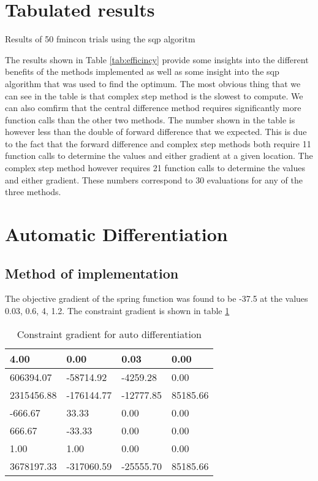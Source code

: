 \documentclass{article}
\begin{document}
\section{Tabulated results}
\begin{table}[H]
	\caption{Results of 50 fmincon trials using the sqp algoritm}
	\label{tab:efficincy}
	\noindent{}
\end{table}

The results shown in Table \ref{tab:efficincy} provide some insights into the
different benefits of the methods implemented as well as some insight into the
sqp algorithm that was used to find the optimum.  The most obvious thing that we
can see in the table is that complex step method is the slowest to compute.  We
can also comfirm that the central difference method requires significantly more
function calls than the other two methods.  The number shown in the table is
however less than the double of forward difference that we expected.  This is
due to the fact that the forward difference and complex step methods both
require 11 function calls to determine the values and either gradient at a given location. The
complex step method however requires 21 function calls to determine the values and either
gradient.  These numbers correspond to 30 evaluations for any of the three
methods.


\section{Automatic Differentiation}
\subsection{Method of implementation}
The objective gradient of the spring function was found to be -37.5 at the values 0.03, 0.6, 4, 1.2.  The constraint gradient is shown in table \ref{tab:ad_grad}

\begin{table}[h]
	\centering
	\caption{Constraint gradient for auto differentiation}
	\label{tab:ad_grad}
	\begin{tabular}{|l|l|l|l|}
		\hline
		4.00       & 0.00       & 0.03      & 0.00     \\\hline
		606394.07  & -58714.92  & -4259.28  & 0.00     \\\hline
		2315456.88 & -176144.77 & -12777.85 & 85185.66 \\\hline
		-666.67    & 33.33      & 0.00      & 0.00     \\\hline
		666.67     & -33.33     & 0.00      & 0.00     \\\hline
		1.00       & 1.00       & 0.00      & 0.00     \\\hline
		3678197.33 & -317060.59 & -25555.70 & 85185.66 \\\hline
	\end{tabular}
\end{table}
\end{document}
